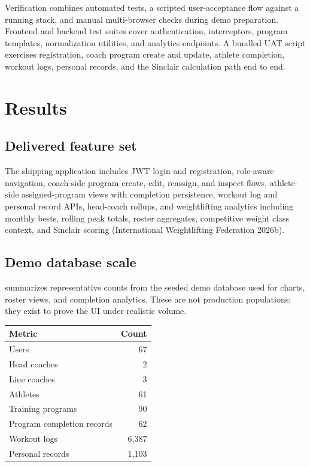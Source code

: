 \documentclass[
  letterpaper,
  DIV=11,
  numbers=noendperiod]{scrartcl}
\begin{document}
Verification combines automated tests, a scripted user-acceptance flow
against a running stack, and manual multi-browser checks during demo
preparation. Frontend and backend test suites cover authentication,
interceptors, program templates, normalization utilities, and analytics
endpoints. A bundled UAT script exercises registration, coach program
create and update, athlete completion, workout logs, personal records,
and the Sinclair calculation path end to end.

\section{Results}\label{results}

\subsection{Delivered feature set}\label{delivered-feature-set}

The shipping application includes JWT login and registration, role-aware
navigation, coach-side program create, edit, reassign, and inspect
flows, athlete-side assigned-program views with completion persistence,
workout log and personal record APIs, head-coach rollups, and
weightlifting analytics including monthly bests, rolling peak totals,
roster aggregates, competitive weight class context, and Sinclair
scoring (International Weightlifting Federation 2026b).

\subsection{Demo database scale}\label{demo-database-scale}

 summarizes representative counts from the seeded demo
database used for charts, roster views, and completion analytics. These
are not production populations; they exist to prove the UI under
realistic volume.

\begin{strip}
\noindent\begin{minipage}{\textwidth}
\centering
\small
\begin{tabular}{lr}
\toprule
\textbf{Metric} & \textbf{Count} \\
\midrule
Users & 67 \\
Head coaches & 2 \\
Line coaches & 3 \\
Athletes & 61 \\
Training programs & 90 \\
Program completion records & 62 \\
Workout logs & 6,387 \\
Personal records & 1,103 \\
\bottomrule
\end{tabular}
\label{tbl-demo}
\end{minipage}
\end{strip}
\FloatBarrier
\end{document}
